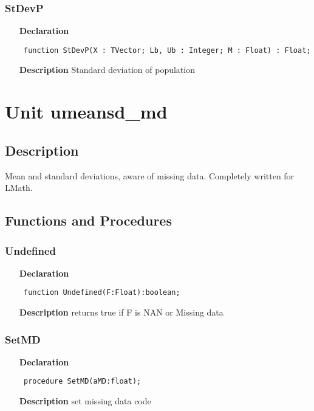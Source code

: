 \documentclass[12pt,a4paper,oneside]{report}
\newcommand{\lmath}[1]{   %
	\marginpar{\vspace{#1} 
		\begin{flushright}
			LMath
	\end{flushright} }
}
\newcommand{\declarationitem}[1]{\textbf{#1}}
\newcommand{\descriptiontitle}[1]{\textbf{#1}}
\newcommand{\code}[1]{\texttt{#1}}
\begin{document}
\subsubsection{StDevP}
\label{umeansd-StDevP}
\begin{itemize}\item[\declarationitem{Declaration}\hfill]
	\begin{flushleft}
		\code{
			function StDevP(X : TVector; Lb, Ub : Integer; M : Float) : Float;}
	\end{flushleft}
	\item[\descriptiontitle{Description}]
	Standard deviation of population
\end{itemize}
\section{Unit umeansd{\_}md}\lmath{-24pt}
\label{umeansd_md}
\subsection{Description}
Mean and standard deviations, aware of missing data. Completely written for LMath.
\subsection{Functions and Procedures}
\subsubsection{Undefined}
\label{umeansd_md-Undefined}
\begin{itemize}\item[\declarationitem{Declaration}\hfill]
	\begin{flushleft}
		\code{
			function Undefined(F:Float):boolean;}
	\end{flushleft}
	\item[\descriptiontitle{Description}]
	returns true if F is NAN or Missing data
\end{itemize}
\subsubsection{SetMD}
\label{umeansd_md-SetMD}
\begin{itemize}\item[\declarationitem{Declaration}\hfill]
	\begin{flushleft}
		\code{
			procedure SetMD(aMD:float);}
	\end{flushleft}
	\item[\descriptiontitle{Description}]
	set missing data code
\end{itemize}
\end{document}
